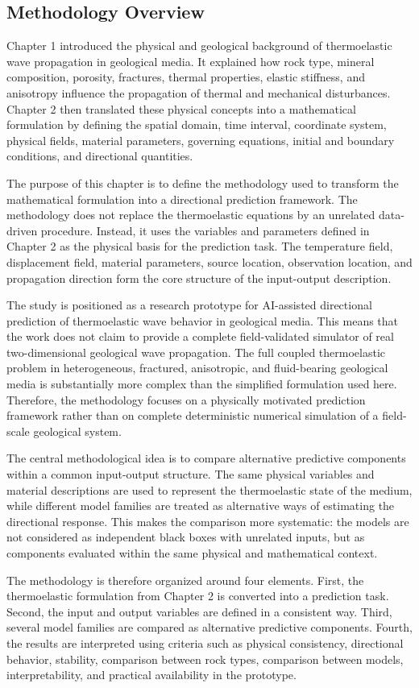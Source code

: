 \subsection{Methodology Overview}

Chapter 1 introduced the physical and geological background of thermoelastic wave propagation in geological media. It explained how rock type, mineral composition, porosity, fractures, thermal properties, elastic stiffness, and anisotropy influence the propagation of thermal and mechanical disturbances. Chapter 2 then translated these physical concepts into a mathematical formulation by defining the spatial domain, time interval, coordinate system, physical fields, material parameters, governing equations, initial and boundary conditions, and directional quantities.

The purpose of this chapter is to define the methodology used to transform the mathematical formulation into a directional prediction framework. The methodology does not replace the thermoelastic equations by an unrelated data-driven procedure. Instead, it uses the variables and parameters defined in Chapter 2 as the physical basis for the prediction task. The temperature field, displacement field, material parameters, source location, observation location, and propagation direction form the core structure of the input-output description.

The study is positioned as a research prototype for AI-assisted directional prediction of thermoelastic wave behavior in geological media. This means that the work does not claim to provide a complete field-validated simulator of real two-dimensional geological wave propagation. The full coupled thermoelastic problem in heterogeneous, fractured, anisotropic, and fluid-bearing geological media is substantially more complex than the simplified formulation used here. Therefore, the methodology focuses on a physically motivated prediction framework rather than on complete deterministic numerical simulation of a field-scale geological system.

The central methodological idea is to compare alternative predictive components within a common input-output structure. The same physical variables and material descriptions are used to represent the thermoelastic state of the medium, while different model families are treated as alternative ways of estimating the directional response. This makes the comparison more systematic: the models are not considered as independent black boxes with unrelated inputs, but as components evaluated within the same physical and mathematical context.

The methodology is therefore organized around four elements. First, the thermoelastic formulation from Chapter 2 is converted into a prediction task. Second, the input and output variables are defined in a consistent way. Third, several model families are compared as alternative predictive components. Fourth, the results are interpreted using criteria such as physical consistency, directional behavior, stability, comparison between rock types, comparison between models, interpretability, and practical availability in the prototype.
